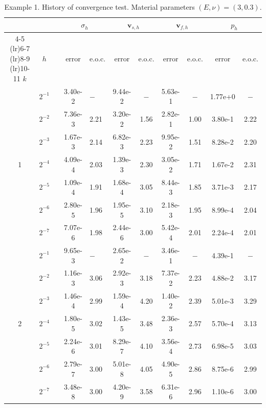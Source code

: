 \documentclass[10pt,letterpaper]{amsart}
\theoremstyle{plain} %
\theoremstyle{remark} %
\newcommand{\vect}[1]{\mathbf{#1}}
\begin{document}
%

\begin{table}[htbp!]
\small
\centering
\caption{Example 1. History of convergence test. Material parameters $(E,\nu) = (3,0.3)$.}
\begin{tabular}{@{\hskip .1in}ccl@{\hskip .1in}cl@{\hskip .1in}cc@{\hskip .1in}cc@{\hskip .1in}cc} \toprule
& & &\multicolumn{2}{c}{$\sigma_{h}$}&\multicolumn{2}{c}{$\vect{v}_{s,h}$}&\multicolumn{2}{c}{$\vect{v}_{f,h}$}&\multicolumn{2}{c}{$p_{h}$}\\ 
\cmidrule(lr){4-5} \cmidrule(lr){6-7} \cmidrule(lr){8-9} \cmidrule(lr){10-11}
$k$ & $h$ & & error & e.o.c. & error & e.o.c. & error & e.o.c.& error & e.o.c.\\ \midrule
\multirow{7}{*}{1} 
& $2^{-1}$   & & 3.40e-2 & $-$  & 9.44e-2 & $-$  & 5.63e-1 & $-$  & 1.77e+0 & $-$ \\
& $2^{-2}$   & & 7.36e-3 & 2.21 & 3.20e-2 & 1.56 & 2.82e-1 & 1.00 & 3.80e-1 & 2.22 \\
& $2^{-3}$   & & 1.67e-3 & 2.14 & 6.82e-3 & 2.23 & 9.95e-2 & 1.51 & 8.28e-2 & 2.20 \\
& $2^{-4}$   & & 4.09e-4 & 2.03 & 1.39e-3 & 2.30 & 3.05e-2 & 1.71 & 1.67e-2 & 2.31 \\
& $2^{-5}$   & & 1.09e-4 & 1.91 & 1.68e-4 & 3.05 & 8.44e-3 & 1.85 & 3.71e-3 & 2.17 \\
& $2^{-6}$   & & 2.80e-5 & 1.96 & 1.95e-5 & 3.10 & 2.18e-3 & 1.95 & 8.99e-4 & 2.04 \\
& $2^{-7}$   & & 7.07e-6 & 1.98 & 2.44e-6 & 3.00 & 5.42e-4 & 2.01 & 2.24e-4 & 2.01 \\
\midrule
\multirow{7}{*}{2} 
& $2^{-1}$   & & 9.65e-3 & $-$  & 2.65e-2 & $-$  & 3.46e-1 & $-$  & 4.39e-1 & $-$  \\
& $2^{-2}$   & & 1.16e-3 & 3.06 & 2.92e-3 & 3.18 & 7.37e-2 & 2.23 & 4.88e-2 & 3.17 \\
& $2^{-3}$   & & 1.46e-4 & 2.99 & 1.59e-4 & 4.20 & 1.40e-2 & 2.39 & 5.01e-3 & 3.29 \\
& $2^{-4}$   & & 1.80e-5 & 3.02 & 1.43e-5 & 3.48 & 2.36e-3 & 2.57 & 5.70e-4 & 3.13 \\
& $2^{-5}$   & & 2.24e-6 & 3.01 & 8.29e-7 & 4.10 & 3.56e-4 & 2.73 & 6.98e-5 & 3.03 \\
& $2^{-6}$   & & 2.79e-7 & 3.00 & 5.01e-8 & 4.05 & 4.90e-5 & 2.86 & 8.75e-6 & 2.99 \\
& $2^{-7}$   & & 3.48e-8 & 3.00 & 4.20e-9 & 3.58 & 6.31e-6 & 2.96 & 1.10e-6 & 3.00 \\

\end{tabular}
\end{table}
\end{document}
